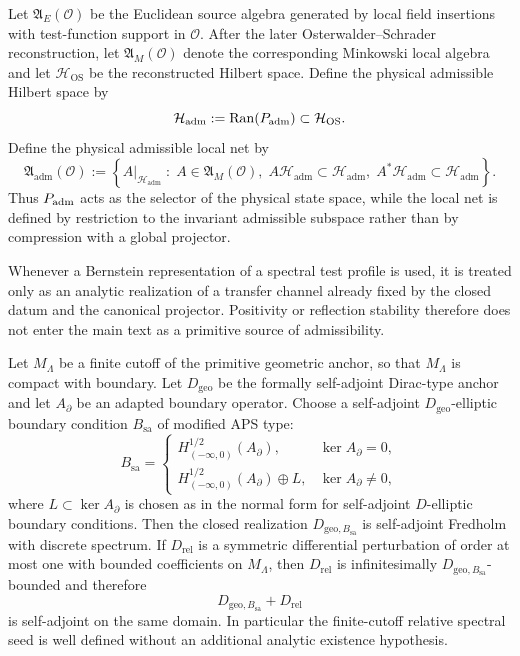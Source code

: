 \begin{definition}
\label{def:physical-admissible-local-net}
Let $\mathfrak A_E(\mathcal O)$ be the Euclidean source algebra generated by local field insertions
with test-function support in $\mathcal O$. After the later Osterwalder--Schrader reconstruction,
let $\mathfrak A_M(\mathcal O)$ denote the corresponding Minkowski local algebra and let
$\mathcal H_{\mathrm{OS}}$ be the reconstructed Hilbert space. Define the physical admissible
Hilbert space by
\[
\mathcal H_{\mathrm{adm}}:=\operatorname{Ran}(P_{\mathrm{adm}})\subset \mathcal H_{\mathrm{OS}}.
\]
Define the physical admissible local net by
\[
\mathfrak A_{\mathrm{adm}}(\mathcal O)
:=
\left\{
A|_{\mathcal H_{\mathrm{adm}}}\;:\;
A\in\mathfrak A_M(\mathcal O),\;
A\mathcal H_{\mathrm{adm}}\subset \mathcal H_{\mathrm{adm}},\;
A^\ast\mathcal H_{\mathrm{adm}}\subset \mathcal H_{\mathrm{adm}}
\right\}.
\]
Thus $P_{\mathrm{adm}}$ acts as the selector of the physical state space, while the local net is defined by
restriction to the invariant admissible subspace rather than by compression with a global
projector.
\end{definition}

\begin{remark}
\label{ass:bernstein-positivity}
Whenever a Bernstein representation of a spectral test profile is used, it is treated only as an
analytic realization of a transfer channel already fixed by the closed datum and the canonical
projector. Positivity or reflection stability therefore does not enter the main text as a
primitive source of admissibility.
\end{remark}

\begin{theorem}
\label{thm:well-posed-primitive-dynamics}
\label{thm:primitive-selfadjoint-realization}
Let $M_\Lambda$ be a finite cutoff of the primitive geometric anchor, so that $M_\Lambda$ is
compact with boundary. Let $D_{\mathrm{geo}}$ be the formally self-adjoint Dirac-type anchor and
let $A_\partial$ be an adapted boundary operator. Choose a self-adjoint $D_{\mathrm{geo}}$-elliptic
boundary condition $B_{\mathrm{sa}}$ of modified APS type:
\[
B_{\mathrm{sa}}=
\begin{cases}
H^{1/2}_{(-\infty,0)}(A_\partial), & \ker A_\partial=0,\\[2mm]
H^{1/2}_{(-\infty,0)}(A_\partial)\oplus L, & \ker A_\partial\neq0,
\end{cases}
\]
where $L\subset\ker A_\partial$ is chosen as in the normal form for self-adjoint $D$-elliptic
boundary conditions. Then the closed realization $D_{\mathrm{geo},B_{\mathrm{sa}}}$ is self-adjoint
Fredholm with discrete spectrum. If $D_{\mathrm{rel}}$ is a symmetric differential perturbation of
order at most one with bounded coefficients on $M_\Lambda$, then $D_{\mathrm{rel}}$ is
infinitesimally $D_{\mathrm{geo},B_{\mathrm{sa}}}$-bounded and therefore
\[
D_{\mathrm{geo},B_{\mathrm{sa}}}+D_{\mathrm{rel}}
\]
is self-adjoint on the same domain. In particular the finite-cutoff relative spectral seed is well
defined without an additional analytic existence hypothesis.
\end{theorem}

